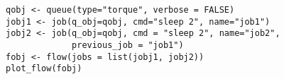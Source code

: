 \begin{kframe}
\begin{verbatim}
qobj <- queue(type="torque", verbose = FALSE)
jobj1 <- job(q_obj=qobj, cmd="sleep 2", name="job1")
jobj2 <- job(q_obj=qobj, cmd = "sleep 2", name="job2", 
             previous_job = "job1")
fobj <- flow(jobs = list(jobj1, jobj2))
plot_flow(fobj)
\end{verbatim}
\end{kframe}